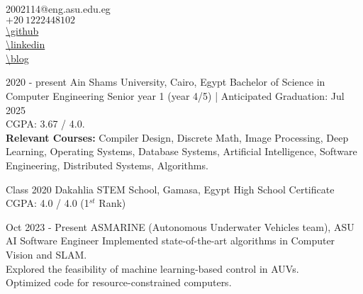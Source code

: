 \documentclass[hidelinks]{report}
\begin{document}
\noindent
\begin{minipage}{.4\textwidth}
    \vspace{-1mm}
\end{minipage}%
\hfill\hspace{.2\textwidth}
\begin{minipage}{.5\textwidth}
 \large
    2002114@eng.asu.edu.eg \\[.2\baselineskip]
    $+20 \ 1222448102$ \\[.2\baselineskip]
    \url{\github} \\[.2\baselineskip]
    \url{\linkedin} \\ %
    \url{\blog} 
\end{minipage}


\vspace{2mm}

\large 
{}

\entry
    {2020 - present} 
    {Ain Shams University, \normalfont Cairo, Egypt  }
    {Bachelor of Science in Computer Engineering }
    {\textbullet Senior year 1 (year 4/5) | Anticipated Graduation: Jul 2025 \\ 
     \textbullet CGPA: 3.67 / 4.0. \\  
     \textbullet \textbf{Relevant Courses:} Compiler Design, Discrete Math, Image Processing, Deep Learning,
     Operating Systems, Database Systems, Artificial Intelligence, Software Engineering, Distributed Systems, 
     Algorithms. 
    }  

\entry
    {Class 2020}
    {Dakahlia STEM School, \normalfont Gamasa, Egypt}
    {High School Certificate}
    {
    \textbullet CGPA: 4.0 / 4.0 (1$^{st}$ Rank)
    }

\vspace{2mm}


\entry
    {Oct 2023 - Present }
    {ASMARINE (Autonomous Underwater Vehicles team), \normalfont ASU  }
    {AI Software Engineer}
    {
      \textbullet Implemented state-of-the-art algorithms in Computer Vision and SLAM. \\
      \textbullet Explored the feasibility of machine learning-based control in AUVs. \\
      \textbullet Optimized code for resource-constrained computers.
    }
\end{document}
